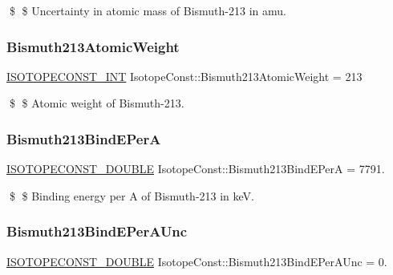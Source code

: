 \$ \$ Uncertainty in atomic mass of Bismuth-\/213 in amu. \mbox{\label{group___isotope_const-_bismuth-_bi213_ga073c01ade862db842439f9161faf1a0b}} 
\subsubsection{\texorpdfstring{Bismuth213\+Atomic\+Weight}{Bismuth213AtomicWeight}}
{\footnotesize\ttfamily \mbox{\hyperlink{group___isotope_const-_macros_ga5f18360b3e99483a35c32d789e62621c}{I\+S\+O\+T\+O\+P\+E\+C\+O\+N\+S\+T\+\_\+\+I\+NT}} Isotope\+Const\+::\+Bismuth213\+Atomic\+Weight = 213}

\$ \$ Atomic weight of Bismuth-\/213. \mbox{\label{group___isotope_const-_bismuth-_bi213_ga39e31d14186e7e953d7ac5b784a7d8ea}} 
\subsubsection{\texorpdfstring{Bismuth213\+Bind\+E\+PerA}{Bismuth213BindEPerA}}
{\footnotesize\ttfamily \mbox{\hyperlink{group___isotope_const-_macros_ga8f45a7272ce02c0b4c65c44636ed719a}{I\+S\+O\+T\+O\+P\+E\+C\+O\+N\+S\+T\+\_\+\+D\+O\+U\+B\+LE}} Isotope\+Const\+::\+Bismuth213\+Bind\+E\+PerA = 7791.}

\$ \$ Binding energy per A of Bismuth-\/213 in keV. \mbox{\label{group___isotope_const-_bismuth-_bi213_gaaa599a871a76d7d563b6f870e37c7fde}} 
\subsubsection{\texorpdfstring{Bismuth213\+Bind\+E\+Per\+A\+Unc}{Bismuth213BindEPerAUnc}}
{\footnotesize\ttfamily \mbox{\hyperlink{group___isotope_const-_macros_ga8f45a7272ce02c0b4c65c44636ed719a}{I\+S\+O\+T\+O\+P\+E\+C\+O\+N\+S\+T\+\_\+\+D\+O\+U\+B\+LE}} Isotope\+Const\+::\+Bismuth213\+Bind\+E\+Per\+A\+Unc = 0.}

